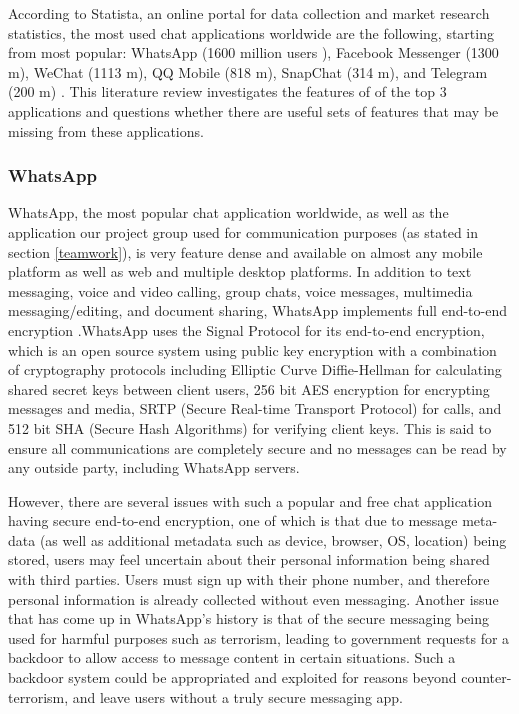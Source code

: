 According to Statista, an online portal for data collection and market research statistics, the most used chat applications worldwide are the following, starting from most popular: WhatsApp (1600 million users ), Facebook Messenger (1300 m), WeChat (1113 m), QQ Mobile (818 m), SnapChat (314 m), and Telegram (200 m) \cite{Statista-chatusers}. This literature review investigates the features of of the top 3 applications and questions whether there are useful sets of features that may be missing from these applications.

\subsubsection{WhatsApp}

WhatsApp, the most popular chat application worldwide, as well as the application our project group used for communication purposes (as stated in section \ref{teamwork}), is very feature dense and available on almost any mobile platform as well as web and multiple desktop platforms. In addition to text messaging, voice and video calling, group chats, voice messages, multimedia messaging/editing, and document sharing, WhatsApp implements full end-to-end encryption \cite{whatsapp-main}.WhatsApp uses the Signal Protocol for its end-to-end encryption, which is an open source system using public key encryption with a combination of cryptography protocols including Elliptic Curve Diffie-Hellman for calculating shared secret keys between client users, 256 bit AES encryption for encrypting messages and media, SRTP (Secure Real-time Transport Protocol) for calls, and 512 bit SHA (Secure Hash Algorithms) for verifying client keys\cite{whatsapp-security}\cite{rastogi2017whatsapp}. This is said to ensure all communications are completely secure and no messages can be read by any outside party, including WhatsApp servers. 

However, there are several issues with such a popular and free chat application having secure end-to-end encryption, one of which is that due to message meta-data (as well as additional metadata such as device, browser, OS, location) being stored, users may feel uncertain about their personal information being shared with third parties\cite{metadata-collection}. Users must sign up with their phone number, and therefore personal information is already collected without even messaging. Another issue that has come up in WhatsApp's history is that of the secure messaging being used for harmful purposes such as terrorism, leading to government requests for a backdoor to allow access to message content in certain situations\cite{whatsapp-backdoor}. Such a backdoor system could be appropriated and exploited for reasons beyond counter-terrorism, and leave users without a truly secure messaging app. 


